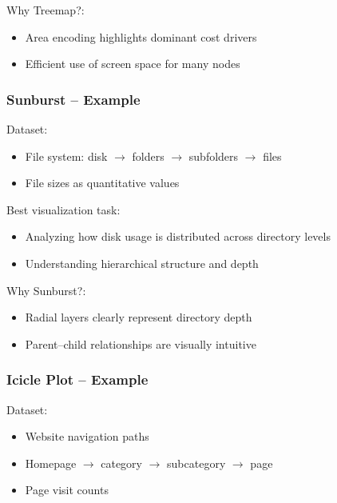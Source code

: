 \begin{exercise}
        Why Treemap?:
        \begin{itemize}
            \item Area encoding highlights dominant cost drivers
            \item Efficient use of screen space for many nodes
        \end{itemize}

        \subsubsection*{Sunburst -- Example}

        Dataset:
        \begin{itemize}
            \item File system: disk $\rightarrow$ folders $\rightarrow$ subfolders $\rightarrow$ files
            \item File sizes as quantitative values
        \end{itemize}

        Best visualization task:
        \begin{itemize}
            \item Analyzing how disk usage is distributed across directory levels
            \item Understanding hierarchical structure and depth
        \end{itemize}

        Why Sunburst?:
        \begin{itemize}
            \item Radial layers clearly represent directory depth
            \item Parent--child relationships are visually intuitive
        \end{itemize}

        \subsubsection*{Icicle Plot -- Example}

        Dataset:
        \begin{itemize}
            \item Website navigation paths
            \item Homepage $\rightarrow$ category $\rightarrow$ subcategory $\rightarrow$ page
            \item Page visit counts
        \end{itemize}


\end{exercise}
